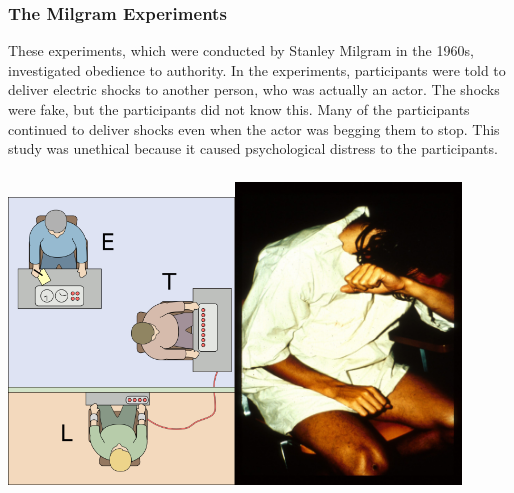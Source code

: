 \documentclass[
  b5paper]{book}
\begin{document}
\hypertarget{the-milgram-experiments}{%
\subsubsection*{The Milgram Experiments}\label{the-milgram-experiments}}

These experiments, which were conducted by Stanley Milgram in the 1960s, investigated obedience to authority. In the experiments, participants were told to deliver electric shocks to another person, who was actually an actor. The shocks were fake, but the participants did not know this. Many of the participants continued to deliver shocks even when the actor was begging them to stop. This study was unethical because it caused psychological distress to the participants.

\hypertarget{the-milgram-experimentsthe-stanford-prison-experiment}{%
\subsubsection*{\texorpdfstring{\protect\includegraphics[width=0.45\textwidth,height=\textheight]{images/Milgram_experiment.png}\protect\includegraphics[width=0.45\textwidth,height=\textheight]{images/prisoner-breaks-down.png}}{The Milgram ExperimentsThe Stanford Prison Experiment}}\label{the-milgram-experimentsthe-stanford-prison-experiment}}
\end{document}
